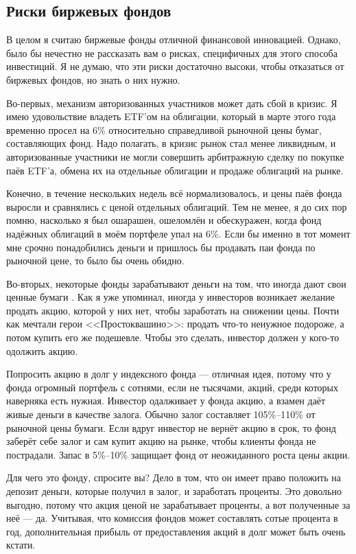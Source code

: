 \subsection{Риски биржевых фондов}

В целом я считаю биржевые фонды отличной финансовой инновацией. Однако, было бы 
нечестно не рассказать вам о рисках, специфичных для этого способа инвестиций. Я 
не думаю, что эти риски достаточно высоки, чтобы отказаться от биржевых фондов, 
но знать о них нужно.

Во-первых, механизм авторизованных участников может дать сбой в кризис. Я имею 
удовольствие владеть ETF'ом на облигации, который в марте этого года временно 
просел на 6\% относительно справедливой рыночной цены бумаг, составляющих фонд. 
Надо полагать, в кризис рынок стал менее ликвидным, и авторизованные участники 
не могли совершить арбитражную сделку по покупке паёв ETF'а, обмена их на 
отдельные облигации и продаже облигаций на рынке.

Конечно, в течение нескольких недель всё нормализовалось, и цены паёв фонда 
выросли и сравнялись с ценой отдельных облигаций. Тем не менее, я до сих пор 
помню, насколько я был ошарашен, ошеломлён и обескуражен, когда фонд надёжных 
облигаций в моём портфеле упал на 6\%. Если бы именно в тот момент мне срочно 
понадобились деньги и пришлось бы продавать паи фонда по рыночной цене, то было 
бы очень обидно.

Во-вторых, некоторые фонды зарабатывают деньги на том, что иногда дают свои 
ценные бумаги . Как я уже упоминал, иногда у 
инвесторов возникает желание продать акцию, которой у них нет, чтобы заработать 
на снижении цены. Почти как мечтали герои <<Простоквашино>>: продать что-то 
ненужное подороже, а потом купить его же подешевле. Чтобы это сделать, инвестор 
должен у кого-то одолжить акцию.

Попросить акцию в долг у индексного фонда --- отличная идея, потому что у фонда 
огромный портфель с сотнями, если не тысячами, акций, среди которых наверняка 
есть нужная. Инвестор одалживает у фонда акцию, а взамен даёт живые деньги в 
качестве залога. Обычно залог составляет 105\%--110\% от рыночной цены бумаги. 
Если вдруг инвестор не вернёт акцию в срок, то фонд заберёт себе залог и сам 
купит акцию на рынке, чтобы клиенты фонда не пострадали. Запас в 5\%--10\% 
защищает фонд от неожиданного роста цены акции.

Для чего это фонду, спросите вы? Дело в том, что он имеет право положить на 
депозит деньги, которые получил в залог, и заработать проценты. Это довольно 
выгодно, потому что акция ценой  не зарабатывает проценты, а вот 
полученные за неё  --- да. Учитывая, что комиссия фондов может 
составлять сотые процента в год, дополнительная прибыль от предоставления акций 
в долг может быть очень кстати.

